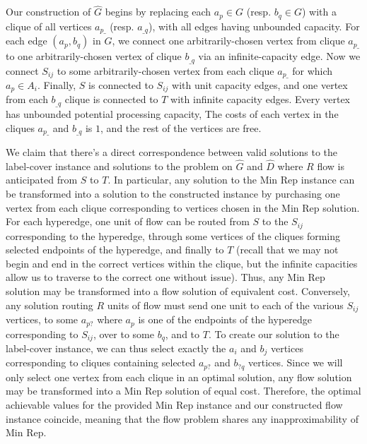 Our construction of $\hat{G}$ begins by replacing each $a_p \in G$ (resp. $b_q \in G$) with a clique of all vertices $a_{p\_}$ (resp. $a_{\_q}$), with all edges having unbounded capacity. For each edge $(a_p, b_q)$ in $G$, we connect one arbitrarily-chosen vertex from clique $a_{p\_}$ to one arbitrarily-chosen vertex of clique $b_{\_q}$ via an infinite-capacity edge. Now we connect $S_{ij}$ to some arbitrarily-chosen vertex from each clique $a_{p\_}$ for which $a_p \in A_i$.  Finally, $S$ is connected to $S_{ij}$ with unit capacity edges, and one vertex from each $b_{\_q}$ clique is connected to $T$ with infinite capacity edges. Every vertex has unbounded potential processing capacity, The costs of each vertex in the cliques $a_{p\_}$ and $b_{\_q}$ is $1$, and the rest of the vertices are free.

We claim that there's a direct correspondence between valid solutions to the label-cover instance and solutions to the problem on $\hat{G}$ and $\hat{D}$ where $R$ flow is anticipated from $S$ to $T$. In particular, any solution to the {\sc Min Rep} instance can be transformed into a solution to the constructed instance by purchasing one vertex from each clique corresponding to vertices chosen in the {\sc Min Rep} solution. For each hyperedge, one unit of flow can be routed from $S$ to the $S_{ij}$ corresponding to the hyperedge, through some vertices of the cliques forming selected endpoints of the hyperedge, and finally to $T$ (recall that we may not begin and end in the correct vertices within the clique, but the infinite capacities allow us to traverse to the correct one without issue). Thus, any {\sc Min Rep} solution may be transformed into a flow solution of equivalent cost. Conversely, any solution routing $R$ units of flow must send one unit to each of the various $S_{ij}$ vertices, to some $a_{p?}$ where $a_p$ is one of the endpoints of the hyperedge corresponding to $S_{ij}$, over to some $b_q$, and to $T$. To create our solution to the label-cover instance, we can thus select exactly the $a_i$ and $b_j$ vertices corresponding to cliques containing selected $a_{p?}$ and $b_{?q}$ vertices. Since we will only select one vertex from each clique in an optimal solution, any flow solution may be transformed into a {\sc Min Rep} solution of equal cost. Therefore, the optimal achievable values for the provided {\sc Min Rep} instance and our constructed flow instance coincide, meaning that the flow problem shares any inapproximability of {\sc Min Rep}.


